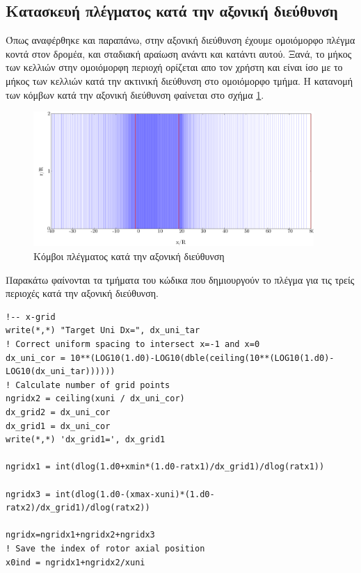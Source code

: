 \subsection{Κατασκευή πλέγματος κατά την αξονική διεύθυνση}

Όπως αναφέρθηκε και παραπάνω, στην αξονική διεύθυνση έχουμε ομοιόμορφο πλέγμα κοντά στον δρομέα, και σταδιακή αραίωση ανάντι και κατάντι αυτού. Ξανά, το μήκος των κελλιών στην ομοιόμορφη περιοχή ορίζεται απο τον χρήστη και είναι ίσο με το μήκος των κελλιών κατά την ακτινική διεύθυνση στο ομοιόμορφο τμήμα. Η κατανομή των κόμβων κατά την αξονική διεύθυνση φαίνεται στο σχήμα \ref{fig:gridx}.

\begin{figure}
    \begin{center}
        \includegraphics[width=0.95\textwidth]{figures/gridx.pdf}
    \end{center}
    \caption{Κόμβοι πλέγματος κατά την αξονική διεύθυνση}
    \label{fig:gridx}
\end{figure}

Παρακάτω φαίνονται τα τμήματα του κώδικα που δημιουργούν το πλέγμα για τις τρείς περιοχές κατά την αξονική διεύθυνση.

\begin{lstlisting}[caption=\textrm{Υπολογισμός παραμέτρων πλέγματος στην αξονική διεύθυνση}, label={lst:xgen}, mathescape=true, breaklines=true, linewidth=.6\textwidth]
!-- x-grid 
write(*,*) "Target Uni Dx=", dx_uni_tar
! Correct uniform spacing to intersect x=-1 and x=0
dx_uni_cor = 10**(LOG10(1.d0)-LOG10(dble(ceiling(10**(LOG10(1.d0)-LOG10(dx_uni_tar))))))
! Calculate number of grid points
ngridx2 = ceiling(xuni / dx_uni_cor)
dx_grid2 = dx_uni_cor
dx_grid1 = dx_uni_cor 
write(*,*) 'dx_grid1=', dx_grid1

ngridx1 = int(dlog(1.d0+xmin*(1.d0-ratx1)/dx_grid1)/dlog(ratx1))

ngridx3 = int(dlog(1.d0-(xmax-xuni)*(1.d0-ratx2)/dx_grid1)/dlog(ratx2))

ngridx=ngridx1+ngridx2+ngridx3
! Save the index of rotor axial position
x0ind = ngridx1+ngridx2/xuni
\end{lstlisting}

